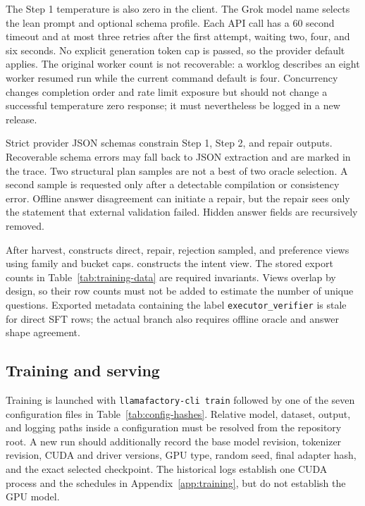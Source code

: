 \documentclass{article}
\begin{document}
The Step 1 temperature is also zero in the client.  The Grok model name selects the lean prompt and
optional schema profile.  Each API call has a 60 second timeout and at most three retries after the
first attempt, waiting two, four, and six seconds.  No explicit generation token cap is passed, so
the provider default applies.  The original worker count is not recoverable: a worklog describes an
eight worker resumed run while the current command default is four.  Concurrency changes completion
order and rate limit exposure but should not change a successful temperature zero response; it must
nevertheless be logged in a new release.

Strict provider JSON schemas constrain Step 1, Step 2, and repair outputs.  Recoverable schema errors
may fall back to JSON extraction and are marked in the trace.  Two structural plan samples are not a
best of two oracle selection.  A second sample is requested only after a detectable compilation or
consistency error.  Offline answer disagreement can initiate a repair, but the repair sees only the
statement that external validation failed.  Hidden answer fields are recursively removed.

After harvest,  constructs direct, repair, rejection sampled,
and preference views using family and bucket caps.   constructs the
intent view.  The stored export counts in Table~\ref{tab:training-data} are required invariants.
Views overlap by design, so their row counts must not be added to estimate the number of unique
questions.  Exported metadata containing the label \texttt{executor\_verifier} is stale for direct
SFT rows; the actual branch also requires offline oracle and answer shape agreement.

\subsection{Training and serving}

Training is launched with \texttt{llamafactory-cli train} followed by one of the seven configuration
files in Table~\ref{tab:config-hashes}.  Relative model, dataset, output, and logging paths inside a
configuration must be resolved from the repository root.  A new run should additionally record the
base model revision, tokenizer revision, CUDA and driver versions, GPU type, random seed, final
adapter hash, and the exact selected checkpoint.  The historical logs establish one CUDA process
and the schedules in Appendix~\ref{app:training}, but do not establish the GPU model.
\end{document}
